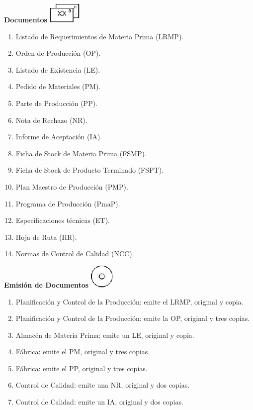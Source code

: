 \begin{center}
  \textbf{Documentos}
  \includegraphics{./Images/Simbolos/simbolo-Documentos.png}
\end{center}
\begin{enumerate}
  \item Listado de Requerimientos de Materia Prima (LRMP).
  \item Orden de Producci\'on (OP).
  \item Listado de Existencia (LE).
  \item Pedido de Materiales (PM).
  \item Parte de Producci\'on (PP).
  \item Nota de Rechazo (NR).
  \item Informe de Aceptaci\'on (IA).
  \item Ficha de Stock de Materia Prima (FSMP).
  \item Ficha de Stock de Producto Terminado (FSPT).
  \item Plan Maestro de Producci\'on (PMP).
  \item Programa de Producci\'on (PmaP).
  \item Especificaciones t\'ecnicas (ET).
  \item Hoja de Ruta (HR).
  \item Normas de Control de Calidad (NCC).
\end{enumerate}

\begin{center}
  \textbf{Emisión de Documentos}
  \includegraphics{./Images/Simbolos/simbolo-Emision-de-Documentos.png}
\end{center}
\begin{enumerate}
  \item Planificaci\'on y Control de la Producci\'on: emite el LRMP, original y copia.
  \item Planificaci\'on y Control de la Producci\'on: emite la OP, original y tres copias. 
  \item Almac\'en de Materia Prima: emite un LE, original y copia.
  \item F\'abrica: emite el PM, original y tres copias.
  \item F\'abrica: emite el PP, original y tres copias.
  \item Control de Calidad: emite una NR, original y dos copias.
  \item Control de Calidad: emite un IA, original y dos copias.
\end{enumerate}

